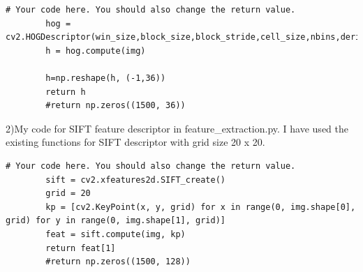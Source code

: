 \begin{lstlisting}[style=Matlab-editor]
# Your code here. You should also change the return value.
        hog = cv2.HOGDescriptor(win_size,block_size,block_stride,cell_size,nbins,deriv_aperture,win_sigma,histogram_norm_type,l2_hys_threshold,gamma_correction,nlevels)
        h = hog.compute(img)
        
        h=np.reshape(h, (-1,36))
        return h
        #return np.zeros((1500, 36))
\end{lstlisting}

2)My code for SIFT feature descriptor in feature\_extraction.py. I have used the existing functions for SIFT descriptor with grid size 20 x 20.
\begin{lstlisting}[style=Matlab-editor]
# Your code here. You should also change the return value.
        sift = cv2.xfeatures2d.SIFT_create()
        grid = 20
        kp = [cv2.KeyPoint(x, y, grid) for x in range(0, img.shape[0], grid) for y in range(0, img.shape[1], grid)]
        feat = sift.compute(img, kp)       
        return feat[1]
        #return np.zeros((1500, 128))
\end{lstlisting}


